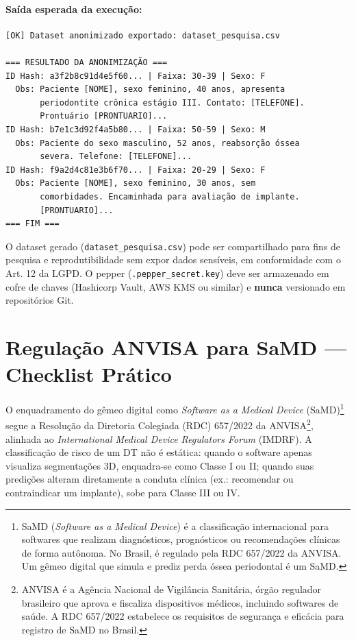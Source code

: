 \paragraph{Saída esperada da execução:}
\begin{lstlisting}[style=output]
[OK] Dataset anonimizado exportado: dataset_pesquisa.csv

=== RESULTADO DA ANONIMIZAÇÃO ===
ID Hash: a3f2b8c91d4e5f60... | Faixa: 30-39 | Sexo: F
  Obs: Paciente [NOME], sexo feminino, 40 anos, apresenta
       periodontite crônica estágio III. Contato: [TELEFONE].
       Prontuário [PRONTUARIO]...
ID Hash: b7e1c3d92f4a5b80... | Faixa: 50-59 | Sexo: M
  Obs: Paciente do sexo masculino, 52 anos, reabsorção óssea
       severa. Telefone: [TELEFONE]...
ID Hash: f9a2d4c81e3b6f70... | Faixa: 20-29 | Sexo: F
  Obs: Paciente [NOME], sexo feminino, 30 anos, sem
       comorbidades. Encaminhada para avaliação de implante.
       [PRONTUARIO]...
=== FIM ===
\end{lstlisting}

O dataset gerado (\texttt{dataset\_pesquisa.csv}) pode ser compartilhado para fins de pesquisa e reprodutibilidade sem expor dados sensíveis, em conformidade com o Art. 12 da LGPD. O pepper (\texttt{.pepper\_secret.key}) deve ser armazenado em cofre de chaves (Hashicorp Vault, AWS KMS ou similar) e \textbf{nunca} versionado em repositórios Git.

\section{Regulação ANVISA para SaMD — Checklist Prático}

O enquadramento do gêmeo digital como \textit{Software as a Medical Device} (SaMD)\footnote[6]{SaMD (\textit{Software as a Medical Device}) é a classificação internacional para softwares que realizam diagnósticos, prognósticos ou recomendações clínicas de forma autônoma. No Brasil, é regulado pela RDC 657/2022 da ANVISA. Um gêmeo digital que simula e prediz perda óssea periodontal é um SaMD.} segue a Resolução da Diretoria Colegiada (RDC) 657/2022 da ANVISA\footnote[7]{ANVISA é a Agência Nacional de Vigilância Sanitária, órgão regulador brasileiro que aprova e fiscaliza dispositivos médicos, incluindo softwares de saúde. A RDC 657/2022 estabelece os requisitos de segurança e eficácia para registro de SaMD no Brasil.}, alinhada ao \textit{International Medical Device Regulators Forum} (IMDRF). A classificação de risco de um DT não é estática: quando o software apenas visualiza segmentações 3D, enquadra-se como Classe I ou II; quando suas predições alteram diretamente a conduta clínica (ex.: recomendar ou contraindicar um implante), sobe para Classe III ou IV.

